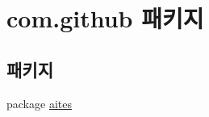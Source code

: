 \hypertarget{namespacecom_1_1github}{}\section{com.\+github 패키지}
\label{namespacecom_1_1github}
\subsection*{패키지}
\begin{DoxyCompactItemize}
\item 
package \mbox{\hyperlink{namespacecom_1_1github_1_1aites}{aites}}
\end{DoxyCompactItemize}
